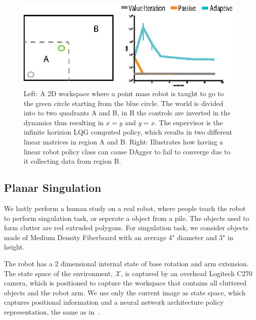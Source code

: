 \documentclass[10pt, conference]{ieeeconf}      %
\begin{document}
\begin{figure}
\centering
\includegraphics{f_figs/p_mass.eps}
\caption{
    \footnotesize
Left: A 2D workspace where a point mass robot is taught to go to the green circle starting from the blue circle. The world is divided into to two quadrants A and B, in B the controls are inverted in the dynamics thus resulting in $x=y$ and $y=x$. The supervisor is the infinite horizion LQG computed policy, which results in two different linear matrices in region A and B. Right: Illustrates how having a linear robot policy class can cause DAgger to fail  to converge due to it collecting data from region B.  }
\vspace*{-1pt}
\label{fig:p_mass}
\end{figure}

\subsection{Planar Singulation}
We lastly perform a human study on a real robot, where people teach the robot to perform singulation task, or seperate a object from a pile. The objects used to form clutter are red extruded polygons.  For singulation task, we consider objects made of Medium Density Fiberboard with an average 4" diameter and 3" in height. 

The robot has a 2 dimensional internal state of base rotation and arm extension. The state space of the environment, $\mathcal{X}$, is captured by  an overhead Logitech C270 camera, which is positioned to capture the workspace that contains all cluttered objects and the robot arm. We use only the current image as state space, which captures positional information and a neural network architecture policy representation, the same as in~\cite{laskeyrobot}.
\end{document}
